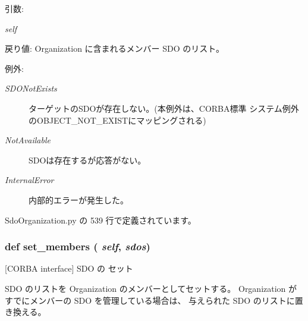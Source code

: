\begin{Desc}
\item[引数:]
\begin{description}
\item[{\em self}]\end{description}
\end{Desc}
\begin{Desc}
\item[戻り値:]Organization に含まれるメンバー SDO のリスト。\end{Desc}
\begin{Desc}
\item[例外:]
\begin{description}
\item[{\em SDONotExists}]ターゲットのSDOが存在しない。(本例外は、CORBA標準 システム例外のOBJECT\_\-NOT\_\-EXISTにマッピングされる) \item[{\em NotAvailable}]SDOは存在するが応答がない。 \item[{\em InternalError}]内部的エラーが発生した。 \end{description}
\end{Desc}


 SdoOrganization.py の 539 行で定義されています。
\subsubsection{\setlength{\rightskip}{0pt plus 5cm}def set\_\-members ( {\em self},  {\em sdos})}\label{classsource__py_1_1_sdo_organization_1_1_organization__impl_d8f02a016fc9247b4bfbc84ae57e7a91}


[CORBA interface] SDO の セット 

SDO のリストを Organization のメンバーとしてセットする。 Organization がすでにメンバーの SDO を管理している場合は、 与えられた SDO のリストに置き換える。

